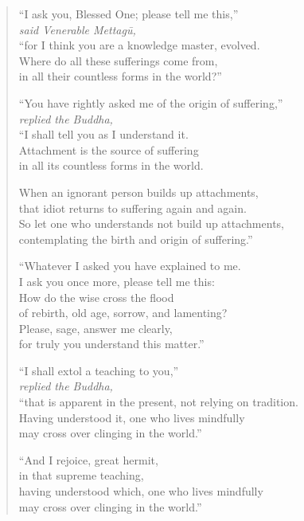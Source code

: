 \documentclass[12pt,openany]{book}%
\newcommand*{\scspeaker}[1]{\hspace{2em}\textit{#1}}
\begin{document}
\begin{verse}%
“I ask you, Blessed One; please tell me this,” \\
\scspeaker{said Venerable \textsanskrit{Mettagū}, }\\
“for I think you are a knowledge master, evolved. \\
Where do all these sufferings come from, \\
in all their countless forms in the world?” 

“You have rightly asked me of the origin of suffering,” \\
\scspeaker{replied the Buddha, }\\
“I shall tell you as I understand it. \\
Attachment is the source of suffering \\
in all its countless forms in the world. 

When an ignorant person builds up attachments, \\
that idiot returns to suffering again and again. \\
So let one who understands not build up attachments, \\
contemplating the birth and origin of suffering.” 

“Whatever I asked you have explained to me. \\
I ask you once more, please tell me this: \\
How do the wise cross the flood \\
of rebirth, old age, sorrow, and lamenting? \\
Please, sage, answer me clearly, \\
for truly you understand this matter.” 

“I shall extol a teaching to you,” \\
\scspeaker{replied the Buddha, }\\
“that is apparent in the present, not relying on tradition. \\
Having understood it, one who lives mindfully \\
may cross over clinging in the world.” 

“And I rejoice, great hermit, \\
in that supreme teaching, \\
having understood which, one who lives mindfully \\
may cross over clinging in the world.” 


\end{verse}
\end{document}
